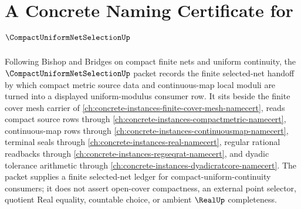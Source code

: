 \chapter{A Concrete Naming Certificate for $\CompactUniformNetSelectionUp$}
\label{ch:concrete-instances-compact-uniform-net-selection-namecert}

Following Bishop and Bridges on compact finite nets and uniform continuity, the $\CompactUniformNetSelectionUp$ packet records the finite selected-net handoff by which compact metric source data and continuous-map local moduli are turned into a displayed uniform-modulus consumer row. It sits beside the finite cover mesh carrier of \autoref{ch:concrete-instances-finite-cover-mesh-namecert}, reads compact source rows through \autoref{ch:concrete-instances-compactmetric-namecert}, continuous-map rows through \autoref{ch:concrete-instances-continuousmap-namecert}, terminal seals through \autoref{ch:concrete-instances-real-namecert}, regular rational readbacks through \autoref{ch:concrete-instances-regseqrat-namecert}, and dyadic tolerance arithmetic through \autoref{ch:concrete-instances-dyadicratcore-namecert}. The packet supplies a finite selected-net ledger for compact-uniform-continuity consumers; it does not assert open-cover compactness, an external point selector, quotient Real equality, countable choice, or ambient $\RealUp$ completeness.

